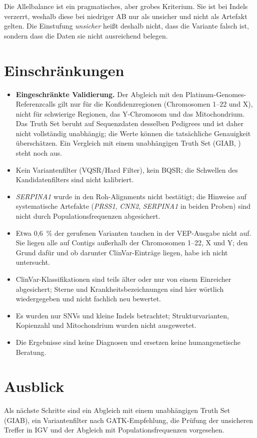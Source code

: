 \documentclass[10pt,a4paper,twocolumn]{article}
\newcommand{\gene}[1]{\textit{#1}}
\begin{document}
Die Allelbalance ist ein pragmatisches, aber grobes Kriterium. Sie ist bei Indels verzerrt, weshalb diese bei niedriger AB nur als unsicher und nicht als Artefakt gelten. Die Einstufung \emph{unsicher} hei\ss t deshalb nicht, dass die Variante falsch ist, sondern dass die Daten sie nicht ausreichend belegen.

\section{Einschr\"ankungen}
\begin{itemize}
\item \textbf{Eingeschr\"ankte Validierung.} Der Abgleich mit den Platinum-Genomes-Referenzcalls gilt nur f\"ur die Konfidenzregionen (Chromosomen 1--22 und X), nicht f\"ur schwierige Regionen, das Y-Chromosom und das Mitochondrium. Das Truth Set beruht auf Sequenzdaten desselben Pedigrees \citep{eberle2017} und ist daher nicht vollst\"andig unabh\"angig; die Werte k\"onnen die tats\"achliche Genauigkeit \"ubersch\"atzen. Ein Vergleich mit einem unabh\"angigen Truth Set (GIAB, \citealp{zook2014}) steht noch aus.
\item Kein Variantenfilter (VQSR/Hard Filter), kein BQSR; die Schwellen des Kandidatenfilters sind nicht kalibriert.
\item \gene{SERPINA1} wurde in den Roh-Alignments nicht best\"atigt; die Hinweise auf systematische Artefakte (\gene{PRSS1}, \gene{CNN2}, \gene{SERPINA1} in beiden Proben) sind nicht durch Populationsfrequenzen abgesichert.
\item Etwa 0,6~\% der gerufenen Varianten tauchen in der VEP-Ausgabe nicht auf. Sie liegen alle auf Contigs au\ss erhalb der Chromosomen 1--22, X und Y; den Grund daf\"ur und ob darunter ClinVar-Eintr\"age liegen, habe ich nicht untersucht.
\item ClinVar-Klassifikationen sind teils \"alter oder nur von einem Einreicher abgesichert; Sterne und Krankheitsbezeichnungen sind hier w\"ortlich wiedergegeben und nicht fachlich neu bewertet.
\item Es wurden nur SNVs und kleine Indels betrachtet; Strukturvarianten, Kopienzahl und Mitochondrium wurden nicht ausgewertet.
\item Die Ergebnisse sind keine Diagnosen und ersetzen keine humangenetische Beratung.
\end{itemize}

\section{Ausblick}
Als n\"achste Schritte sind ein Abgleich mit einem unabh\"angigen Truth Set (GIAB), ein Variantenfilter nach GATK-Empfehlung, die Pr\"ufung der unsicheren Treffer in IGV und der Abgleich mit Populationsfrequenzen vorgesehen.
\end{document}
